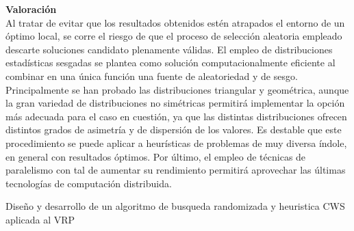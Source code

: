 \documentclass[11pt]{article} %
\begin{document}
\textbf{Valoración}\\[0.2cm]

Al tratar de evitar que los resultados obtenidos estén atrapados el entorno de un óptimo local, se corre el riesgo de que el proceso de selección aleatoria empleado descarte soluciones candidato plenamente válidas. El empleo de distribuciones estadísticas sesgadas se plantea como solución computacionalmente eficiente al combinar en una única función una fuente de aleatoriedad y de sesgo. Principalmente se han probado las distribuciones triangular y geométrica, aunque la gran variedad de distribuciones no simétricas permitirá implementar la opción más adecuada para el caso en cuestión, ya que las distintas distribuciones ofrecen distintos grados de asimetría y de dispersión de los valores. Es destable que este procedimiento se puede aplicar a heurísticas de problemas de muy diversa índole, en general con resultados óptimos. Por último, el empleo de técnicas de paralelismo con tal de aumentar su rendimiento permitirá aprovechar las últimas tecnologías de computación distribuida.

\clearpage

{\fontsize{50}{60}\selectfont Diseño y desarrollo de un algoritmo de busqueda randomizada y heuristica CWS aplicada al VRP}
\end{document}
